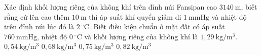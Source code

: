 \begin{ex}
Xác định khối lượng riêng của không khí trên đỉnh núi Fansipan cao $3140\ \mathrm{m}$, biết rằng cứ lên cao thêm $10\ \mathrm{m}$ thì áp suất khí quyển giảm đi $1\ \mathrm{mmHg}$ và nhiệt độ trên đỉnh núi lúc đó là $2\ ^\circ\mathrm{C}$. Biết điều kiện chuẩn ở mặt đất có áp suất $760\ \mathrm{mmHg}$, nhiệt độ $0\ ^\circ\mathrm{C}$ và khối lượng riêng của không khí là $1,29\ \mathrm{kg/m^3}$.
\choice
{$0,54\ \mathrm{kg/m^3}$}
{$0,68\ \mathrm{kg/m^3}$}
{\True $0,75\ \mathrm{kg/m^3}$}
{$0,82\ \mathrm{kg/m^3}$}
\end{ex}

